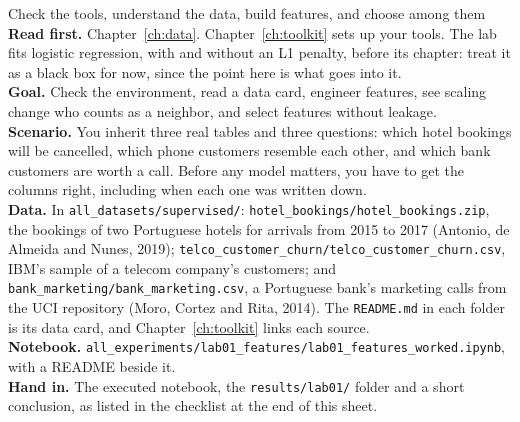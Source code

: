 
\begin{labproject}{Check the tools, understand the data, build features, and choose among them}
\textbf{Read first.} Chapter~\ref{ch:data}. Chapter~\ref{ch:toolkit} sets up your tools. The lab fits logistic regression, with and without an L1 penalty, before its chapter: treat it as a black box for now, since the point here is what goes into it.\\
\textbf{Goal.} Check the environment, read a data card, engineer features, see scaling change who counts as a neighbor, and select features without leakage.\\
\textbf{Scenario.} You inherit three real tables and three questions: which hotel bookings will be cancelled, which phone customers resemble each other, and which bank customers are worth a call. Before any model matters, you have to get the columns right, including when each one was written down.\\
\textbf{Data.} In \texttt{all\_datasets/\allowbreak supervised/}: \texttt{hotel\_bookings/\allowbreak hotel\_bookings.zip}, the bookings of two Portuguese hotels for arrivals from 2015 to 2017 (Antonio, de Almeida and Nunes, 2019); \texttt{telco\_customer\_churn/\allowbreak telco\_customer\_churn.csv}, IBM's sample of a telecom company's customers; and \texttt{bank\_marketing/\allowbreak bank\_marketing.csv}, a Portuguese bank's marketing calls from the UCI repository (Moro, Cortez and Rita, 2014). The \texttt{README.md} in each folder is its data card, and Chapter~\ref{ch:toolkit} links each source.\\
\textbf{Notebook.} \texttt{all\_experiments/\allowbreak lab01\_features/\allowbreak lab01\_features\_worked.ipynb}, with a README beside it.\\
\textbf{Hand in.} The executed notebook, the \texttt{results/lab01/} folder and a short conclusion, as listed in the checklist at the end of this sheet.
\end{labproject}


